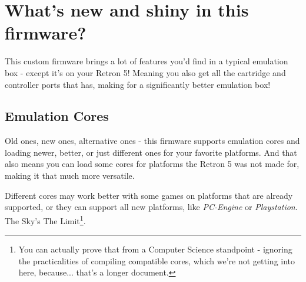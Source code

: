\documentclass[a4paper]{article}
\begin{document}

\let\oldsection\section
\renewcommand\section{\clearpage\oldsection}

\section{What's new and shiny in this firmware?}

This custom firmware brings a lot of features you'd find in a typical emulation box - except it's on your Retron 5! Meaning you also get all the cartridge and controller ports that has, making for a significantly better emulation box!

\subsection{Emulation Cores}

Old ones, new ones, alternative ones - this firmware supports emulation cores and loading newer, better, or just different ones for your favorite platforms. And that also means you can load some cores for platforms the Retron 5 was not made for, making it that much more versatile.

Different cores may work better with some games on platforms that are already supported, or they can support all new platforms, like \emph{PC-Engine} or \emph{Playstation}. The Sky's The Limit\footnote{You can actually prove that from a Computer Science standpoint - ignoring the practicalities of compiling compatible cores, which we're not getting into here, because... that's a longer document.}.
\end{document}
